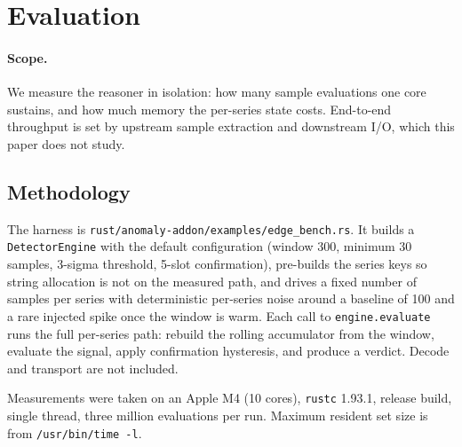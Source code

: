 \section{Evaluation}
\label{sec:eval}


\paragraph{Scope.} We measure the reasoner in isolation: how many sample
evaluations one core sustains, and how much memory the per-series state costs.
End-to-end throughput is set by upstream sample extraction and downstream I/O,
which this paper does not study.

\subsection{Methodology}
The harness is \texttt{rust/anomaly-addon/examples/edge\_bench.rs}. It builds a
\texttt{DetectorEngine} with the default configuration (window 300, minimum 30
samples, 3-sigma threshold, 5-slot confirmation), pre-builds the series keys so
string allocation is not on the measured path, and drives a fixed number of
samples per series with deterministic per-series noise around a baseline of 100
and a rare injected spike once the window is warm. Each call to
\texttt{engine.evaluate} runs the full per-series path: rebuild the rolling
accumulator from the window, evaluate the signal, apply confirmation hysteresis,
and produce a verdict. Decode and transport are not included.

Measurements were taken on an Apple M4 (10 cores), \texttt{rustc} 1.93.1, release
build, single thread, three million evaluations per run. Maximum resident set size
is from \texttt{/usr/bin/time -l}. 

